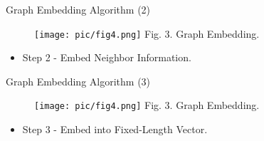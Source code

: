\documentclass{beamer}
\begin{document}
\begin{frame}{Graph Embedding Algorithm (2)}
    \begin{minipage}{0.4\linewidth}
        \begin{figure}[htpb]
            \centering
            \texttt{[image: pic/fig4.png]}
            \tiny{Fig. 3. Graph Embedding.}
        \end{figure}
    \end{minipage}%
    \begin{minipage}{0.65\linewidth}
        \begin{itemize}
            \item Step 2 - Embed Neighbor Information.
        \end{itemize}
    \end{minipage}
\end{frame}

\begin{frame}{Graph Embedding Algorithm (3)}
    \begin{minipage}{0.4\linewidth}
        \begin{figure}[htpb]
            \centering
            \texttt{[image: pic/fig4.png]}
            \tiny{Fig. 3. Graph Embedding.}
        \end{figure}
    \end{minipage}%
    \begin{minipage}{0.65\linewidth}
        \begin{itemize}
            \item Step 3 - Embed into Fixed-Length Vector.
        \end{itemize}
    \end{minipage}
\end{frame}
\end{document}
